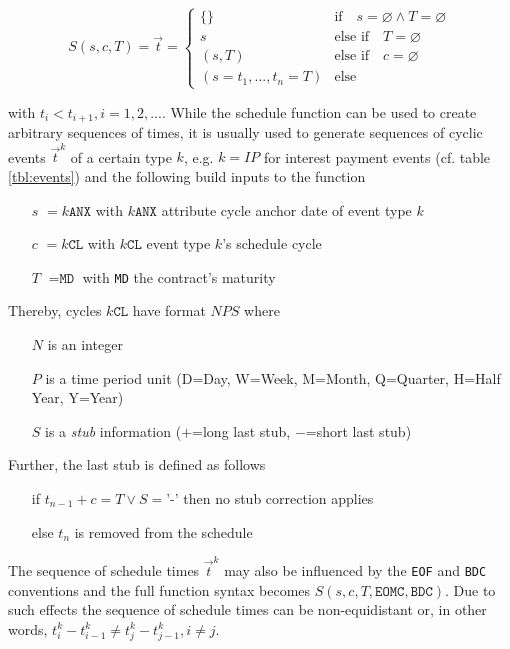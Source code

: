 \documentclass[9pt,oneside]{amsart}
\newcommand{\attr}[1]{\texttt{#1}}
\newcommand{\sdl}[3]{S(#1,#2,#3)}
\newcommand{\undef}{\varnothing}
\begin{document}
\begin{multicols}{2}
\[
	\sdl{s}{c}{T}=\vec{t}=\begin{cases} \{\} & \text{if}\quad s=\undef\land T=\undef\\ 
					s & \text{else if}\quad T=\undef\\
					(s,T) & \text{else if}\quad c=\undef\\
					(s=t_1,...,t_n=T) & \text{else} \end{cases}
\]

with $t_i<t_{i+1}, i=1,2,...$. While the schedule function can be used to create arbitrary sequences of times, it is usually used to generate sequences of cyclic events $\vec{t}^k$ of a certain type $k$, e.g. $k=IP$ for interest payment events (cf. table \ref{tbl:events}) and the following build inputs to the function

\begin{itemize}
	\item[$s$] $=k\attr{ANX}$ with $k\attr{ANX}$ attribute cycle anchor date of event type $k$
	
	\item[$c$] $=k\attr{CL}$ with $k\attr{CL}$ event type $k$'s schedule cycle
	
	\item[$T$] $=\attr{MD}$ with \attr{MD} the contract's maturity
\end{itemize}

Thereby, cycles $k\attr{CL}$ have format $NPS$ where 

\begin{itemize}
	\item[$N$] is an integer
	\item[$P$] is a time period unit (D=Day, W=Week, M=Month, Q=Quarter, H=Half Year, Y=Year)
	\item[$S$] is a \textit{stub} information ($+$=long last stub, $-$=short last stub)
\end{itemize}

Further, the last stub is defined as follows

\begin{itemize}
	\item[if] $t_{n-1}+c=T \lor S=$'-' then no stub correction applies

	\item[else] $t_n$ is removed from the schedule
\end{itemize}

The sequence of schedule times $\vec{t}^k$ may also be influenced by the \attr{EOF} and \attr{BDC} conventions and the full function syntax becomes $\sdl{s}{c}{T, \attr{EOMC}, \attr{BDC}}$. Due to such effects the sequence of schedule times can be non-equidistant or, in other words, $t_i^k-t_{i-1}^k\neq t_j^k-t_{j-1}^k, i\neq j$.\\


\end{multicols}
\end{document}
